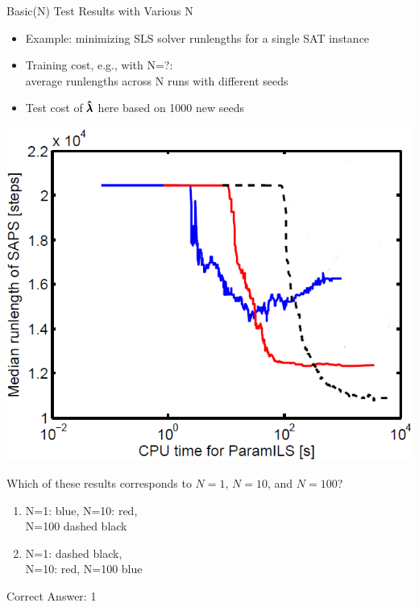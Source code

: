 \begin{frame}[fragile]{Basic(N) Test Results with Various N}

\begin{itemize}
\item Example: minimizing SLS solver runlengths for a single SAT instance
\item \alert{Training cost}, e.g., with N=?:\\average runlengths across N runs with different seeds
\item \alert{Test cost} of $\pmb{\hat{\lambda}}$ here based on 1000 new seeds 
\end{itemize}	

\pause

\begin{multicols}{2}
\begin{center}
	\includegraphics[scale=0.2]{images/basicils_unlabled.png}
\end{center}
\columnbreak{}
\pause
Which of these results corresponds to $N=1$, $N=10$, and $N=100$?\\


\pause
\medskip

\begin{enumerate}
	\item N=1: blue, N=10: red,\\ N=100 dashed black
	\item N=1: dashed black,\\ N=10: red, N=100 blue
\end{enumerate}

\pause
Correct Answer: 1


\end{multicols}


\end{frame}



